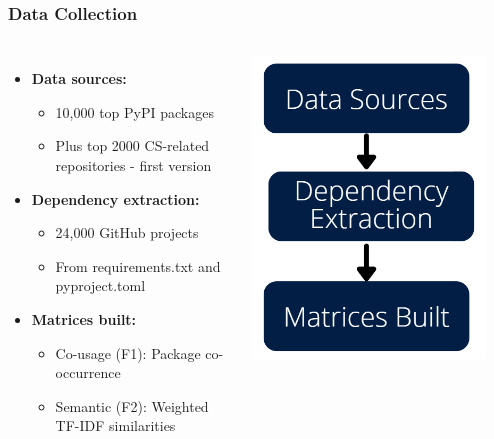 \documentclass{beamer}
\begin{document}
\begin{frame}
\frametitle{Data Collection}

\begin{columns}[T]
\begin{itemize}
\item \textbf{Data sources:}
  \begin{itemize}
  \item 10,000 top PyPI packages
  \item Plus top 2000 CS-related repositories - first version
  \end{itemize}
\item \textbf{Dependency extraction:}
  \begin{itemize}
  \item 24,000 GitHub projects
  \item From requirements.txt and pyproject.toml
  \end{itemize}
\item \textbf{Matrices built:}
  \begin{itemize}
  \item Co-usage (F1): Package co-occurrence
  \item Semantic (F2): Weighted TF-IDF similarities
  \end{itemize}
\end{itemize}

\begin{center}
\includegraphics[width=0.9\textwidth]{Imagens/Fluxograma.png}
\end{center}
\end{columns}

\end{frame}
\end{document}
